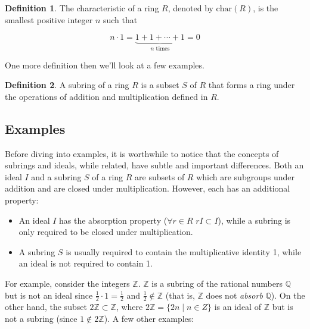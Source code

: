 \documentclass[11pt, oneside]{article}   	%
\theoremstyle{definition}
\newtheorem{definition}{Definition}[section]
\begin{document}
\begin{definition}
The characteristic of a ring $R$, denoted by $\text{char}(R)$, is the smallest positive integer $n$ such that

\begin{equation*}
n \cdot 1 = \underbrace{1 + 1 + \cdots + 1}_{n \text{ times}} = 0
\end{equation*}
\end{definition}


\bigskip
\noindent
One more definition then we'll look at a few examples.

\begin{definition}
A subring of a ring $R$ is a subset $S$ of $R$ that forms a ring under the operations of addition and multiplication defined in $R$.
\end{definition}

\subsection{Examples}
Before diving into examples, it is worthwhile to notice that the concepts of subrings and ideals, while related, have subtle and important differences. 
Both an ideal $I$ and a subring $S$ of a ring $R$ are subsets of $R$ which are subgroups under addition and are closed under multiplication. However, 
each has an  additional property: 

\begin{itemize}
\item An ideal $I$ has the absorption property ($\forall r \in R$ $rI \subset I$), while a subring is only required to be closed 
under multiplication.
\item A subring $S$ is usually required to contain the multiplicative identity 1, while an ideal is not required to contain 1.
\end{itemize}

\noindent
For example, consider the integers $\mathbb{Z}$.  $\mathbb{Z}$ is a subring of the rational numbers $\mathbb{Q}$
but is not an ideal since $\frac{1}{2} \cdot 1 = \frac{1}{2}$ and $\frac{1}{2} \notin  \mathbb{Z}$ (that is, $\mathbb{Z}$ does not
\emph{absorb} $\mathbb{Q}$). On the other hand,  the subset $2\mathbb{Z} \subset \mathbb{Z}$, where $2\mathbb{Z} = \{2n \mid n \in Z\}$
is an ideal of $\mathbb{Z}$  but is not a subring (since $1 \notin 2\mathbb{Z}$). A few other examples:
\end{document}
